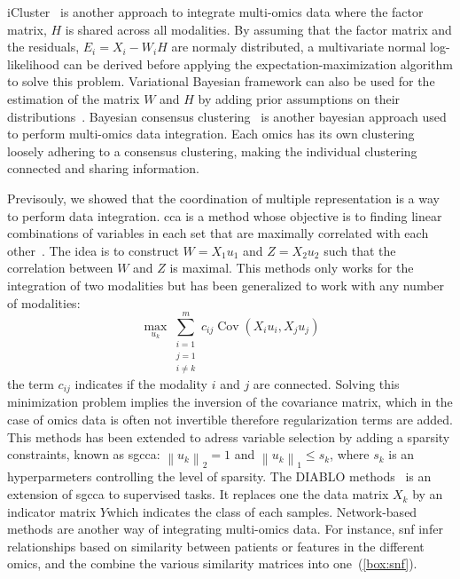 \documentclass[../main.tex]{subfiles}
\begin{document}
	iCluster~\cite{Shen2009} is another approach to integrate multi-omics data where the factor matrix, \(H\) is shared across all modalities.
	By assuming that the factor matrix and the residuals, \(E_i = X_i - W_i H\) are normaly distributed, a multivariate normal log-likelihood can be derived before applying the expectation-maximization algorithm to solve this problem.
	Variational Bayesian framework can also be used for the estimation of the matrix \(W\) and \(H\) by adding prior assumptions on their distributions~\cite{MOFA}.
	Bayesian consensus clustering~\cite{Lock2013_BCC} is another bayesian approach used to perform multi-omics data integration.
	Each omics has its own clustering loosely adhering to a consensus clustering, making the individual clustering connected and sharing information.

	Previsouly, we showed that the coordination of multiple representation is a way to perform data integration.
	\Gls{cca} is a method whose objective is to finding linear combinations of variables in each set that are maximally correlated with each other~\cite{Hardle2007}.
	The idea is to construct \(W=X_1u_1\) and \(Z=X_2u_2\) such that the correlation between \(W\) and \(Z\) is maximal.
	This methods only works for the integration of two modalities but has been generalized to work with any number of modalities:
	\begin{equation}
		\max_{u_k} \sum_{\substack{i=1 \\ j=1 \\ i\neq k}}^{m} c_{ij}\operatorname{Cov}\left(X_i u_i,X_j u_j\right)
	\end{equation}
	the term \(c_{ij}\) indicates if the modality \(i\) and \(j\) are connected.
	Solving this minimization problem implies the inversion of the covariance matrix, which in the case of omics data is often not invertible therefore regularization terms are added.
	This methods has been extended to adress variable selection by adding a sparsity constraints, known as \gls{sgcca}: \({\left\|u_k \right\|}_2 = 1\) and \({\left\|u_k \right\|}_1 \leq s_k\), where \(s_k\) is an hyperparmeters controlling the level of sparsity.
	The DIABLO methods~\cite{DIABLO} is an extension of \gls{sgcca} to supervised tasks.
	It replaces one the data matrix \(X_k\) by an indicator matrix \(Y\)which indicates the class of each samples.
	Network-based methods are another way of integrating multi-omics data.
	For instance, \gls{snf} infer relationships based on similarity between patients or features in the different omics, and the combine the various similarity matrices into one~(\cref{box:snf}).
\end{document}
